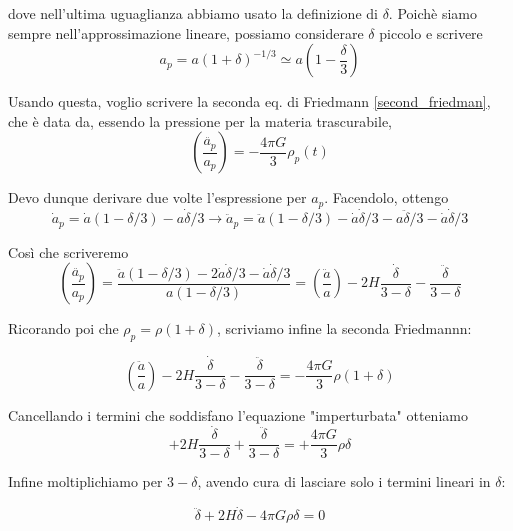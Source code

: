 \documentclass{report}
\begin{document}
dove nell'ultima uguaglianza abbiamo usato la definizione di $\delta$. Poichè siamo sempre nell'approssimazione lineare, possiamo considerare $\delta$ piccolo e scrivere
\begin{equation}
    a_p = a (1+\delta)^{-1/3} \simeq a\left(1 - \frac{\delta}{3}\right)
\end{equation}

Usando questa, voglio scrivere la seconda eq. di Friedmann \ref{second_friedman}, che è data da, essendo la pressione per la materia trascurabile, 
\begin{equation}
    \left(\frac{\ddot{a_p}}{a_p} \right) = -\frac{4\pi G}{3}\rho_p(t)
\end{equation}

Devo dunque derivare due volte l'espressione per $a_p$. Facendolo, ottengo 
\begin{equation}
    \dot{a}_p = \dot{a}(1-\delta /3) - a\dot{\delta}/3 \rightarrow \ddot{a}_p = \ddot{a}(1-\delta /3) - \dot{a}\dot{\delta} /3 - a\ddot{\delta}/3 - \dot{a}\dot{\delta}/3
\end{equation}

Così che scriveremo
\begin{equation}
    \left(\frac{\ddot{a_p}}{a_p} \right) = \frac{\ddot{a}(1-\delta /3) - 2\dot{a}\dot{\delta} /3 - \dot{a}\dot{\delta}/3}{a(1 - \delta/3)} = \left(\frac{\ddot{a}}{a} \right) - 2H \frac{\dot{\delta}}{3 - \delta} - \frac{\ddot{\delta}}{3 - \delta}
\end{equation}

Ricorando poi che $\rho_p = \rho(1+\delta)$, scriviamo infine la seconda Friedmannn: 

\begin{equation}
    \left(\frac{\ddot{a}}{a} \right) - 2H \frac{\dot{\delta}}{3 - \delta} - \frac{\ddot{\delta}}{3 - \delta} = -\frac{4\pi G}{3}\rho(1+\delta)
\end{equation}

Cancellando i termini che soddisfano l'equazione "imperturbata" otteniamo
\begin{equation}
    + 2H \frac{\dot{\delta}}{3 - \delta} + \frac{\ddot{\delta}}{3 - \delta} = +\frac{4\pi G}{3}\rho\delta
\end{equation}

Infine moltiplichiamo per $3-\delta$, avendo cura di lasciare solo i termini lineari in $\delta$: 

\begin{equation}
    \ddot{\delta} + 2H\dot{\delta} - 4\pi G\rho \delta = 0 
\end{equation}
\end{document}
